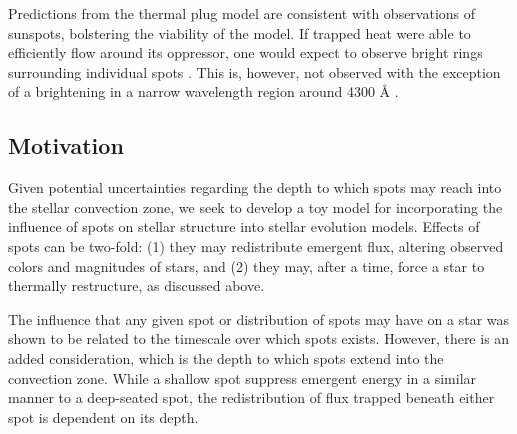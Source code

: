 Predictions from the thermal plug model are consistent with observations of sunspots, bolstering the viability of the model. If trapped heat were able to efficiently flow around its oppressor, one would expect to observe bright rings surrounding individual spots \citep{Spruit1982b}. This is, however, not observed with the exception of a brightening in a narrow wavelength region around 4300 Å \citep{Bray1964}. 

\subsection{Motivation}
Given potential uncertainties regarding the depth to which spots may reach into the stellar convection zone, we seek to develop a toy model for incorporating the influence of spots on stellar structure into stellar evolution models. Effects of spots can be two-fold: (1) they may redistribute emergent flux, altering observed colors and magnitudes of stars, and (2) they may, after a time, force a star to thermally restructure, as discussed above. 

The influence that any given spot or distribution of spots may have on a star was shown to be related to the timescale over which spots exists. However, there is an added consideration, which is the depth to which spots extend into the convection zone. While a shallow spot suppress emergent energy in a similar manner to a deep-seated spot, the redistribution of flux trapped beneath either spot is dependent on its depth.